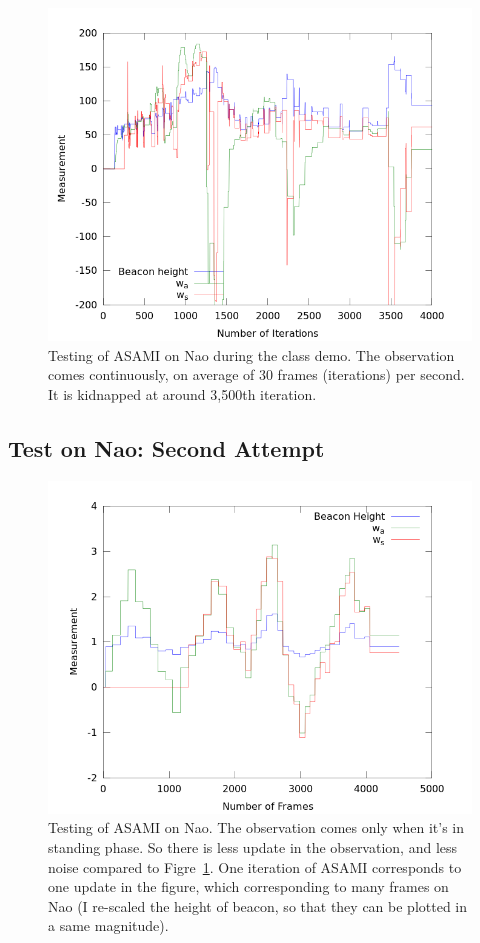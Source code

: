 \documentclass[10pt]{article}
\begin{document}
\begin{figure}[h]
\centering
\includegraphics[width=0.7\columnwidth]{demoResult.png}
\caption{Testing of ASAMI on Nao during the class demo. The
observation comes continuously, on average of 30 frames (iterations)
per second. It is kidnapped at around 3,500th iteration.}
\label{fig:demo}
\end{figure}

\subsection{Test on Nao: Second Attempt}

\begin{figure}[h]
\centering
\includegraphics[width=0.7\columnwidth]{out_obs.png}
\caption{Testing of ASAMI on Nao. The observation comes only when it's
in standing phase. So there is less update in the observation, and
less noise compared to Figre~\ref{fig:demo}. One iteration of ASAMI
corresponds to one update in the figure, which corresponding to many
frames on Nao (I re-scaled the height of beacon, so that they can be
plotted in a same magnitude).}
\label{fig:obs}
\end{figure}
\end{document}
